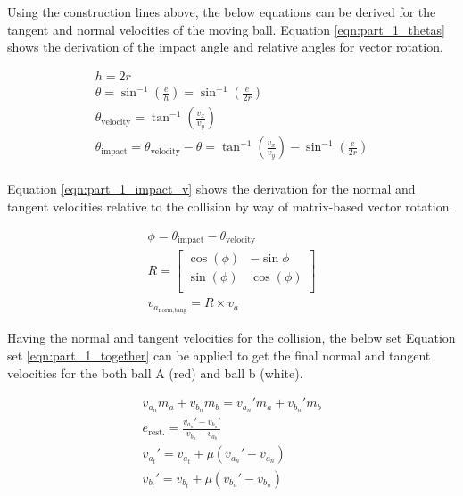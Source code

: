 \documentclass[12pt]{article}
\begin{document}
Using the construction lines above, the below equations can be derived for the tangent and normal velocities of the moving ball. Equation \ref{eqn:part_1_thetas} shows the derivation of the impact angle and relative angles for vector rotation.

\begin{equation}
    \label{eqn:part_1_thetas}
    \begin{gathered}
        h = 2r \\
        \theta = \sin^{-1} \left(\frac{e}{h}\right) = \sin^{-1} \left(\frac{e}{2r}\right)\\
        \theta_\text{velocity} = \tan^{-1}\left(\frac{v_x}{v_y}\right)\\
        \theta_\text{impact} = \theta_\text{velocity} - \theta =  \tan^{-1}\left(\frac{v_x}{v_y}\right) - \sin^{-1} \left(\frac{e}{2r}\right)\\
    \end{gathered}
\end{equation}

Equation \ref{eqn:part_1_impact_v} shows the derivation for the normal and tangent velocities relative to the collision by way of matrix-based vector rotation.

\begin{equation}
    \label{eqn:part_1_impact_v}
    \begin{gathered}
        \phi = \theta_\text{impact} - \theta_\text{velocity}\\
        R = 
        \left[
        \begin{matrix}
            \cos(\phi) & -\sin{\phi}\\
            \sin(\phi) & \cos(\phi)\\
        \end{matrix}
        \right]\\
        v_{a_\text{norm,tang}} = R \times v_a
    \end{gathered}
\end{equation}

Having the normal and tangent velocities for the collision, the below set Equation set \ref{eqn:part_1_together} can be applied to get the final normal and tangent velocities for the both ball A (red) and ball b (white).

\begin{equation}
    \label{eqn:part_1_together}
    \begin{gathered}
        v_{a_n} m_a + v_{b_n} m_b = v_{a_n}' m_a + v_{b_n}' m_b\\
        e_\text{rest.} = \frac{v_{a_n}' - v_{b_n}'}{v_{b_n} - v_{a_b}}\\
        v_{a_t}' = v_{a_t} + \mu \left(v_{a_n}' - v_{a_n}\right)\\
        v_{b_t}' = v_{b_t} + \mu \left(v_{b_n}' - v_{b_n}\right)
    \end{gathered}
\end{equation}
\end{document}
